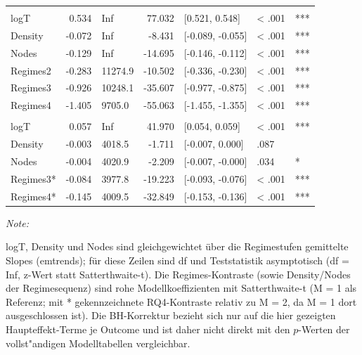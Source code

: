 \begin{table}[!h]
\begin{threeparttable}
\begin{tabular}[t]{lrlrlll}
\addlinespace[0.3em]
\multicolumn{7}{l}{\textbf{controllability}}\\
\hspace{1em}logT & 0.534 & Inf & 77.032 & {}[0.521, 0.548] & < .001 & ***\\
\hspace{1em}Density & -0.072 & Inf & -8.431 & {}[-0.089, -0.055] & < .001 & ***\\
\hspace{1em}Nodes & -0.129 & Inf & -14.695 & {}[-0.146, -0.112] & < .001 & ***\\
\hspace{1em}Regimes2 & -0.283 & 11274.9 & -10.502 & {}[-0.336, -0.230] & < .001 & ***\\
\hspace{1em}Regimes3 & -0.926 & 10248.1 & -35.607 & {}[-0.977, -0.875] & < .001 & ***\\
\hspace{1em}Regimes4 & -1.405 & 9705.0 & -55.063 & {}[-1.455, -1.355] & < .001 & ***\\
\addlinespace[0.3em]
\multicolumn{7}{l}{\textbf{regime sequence}}\\
\hspace{1em}logT & 0.057 & Inf & 41.970 & {}[0.054, 0.059] & < .001 & ***\\
\hspace{1em}Density & -0.003 & 4018.5 & -1.711 & {}[-0.007, 0.000] & .087 & \\
\hspace{1em}Nodes & -0.004 & 4020.9 & -2.209 & {}[-0.007, -0.000] & .034 & *\\
\hspace{1em}Regimes3* & -0.084 & 3977.8 & -19.223 & {}[-0.093, -0.076] & < .001 & ***\\
\hspace{1em}Regimes4* & -0.145 & 4009.5 & -32.849 & {}[-0.153, -0.136] & < .001 & ***\\
\bottomrule
\end{tabular}
\begin{tablenotes}
\item \textit{Note: } 
\item logT, Density und Nodes sind gleichgewichtet über die Regimestufen gemittelte Slopes (emtrends); für diese Zeilen sind df und Teststatistik asymptotisch (df = Inf, z-Wert statt Satterthwaite-t). Die Regimes-Kontraste (sowie Density/Nodes der Regimesequenz) sind rohe Modellkoeffizienten mit Satterthwaite-t (M = 1 als Referenz; mit * gekennzeichnete RQ4-Kontraste relativ zu M = 2, da M = 1 dort ausgeschlossen ist). Die BH-Korrektur bezieht sich nur auf die hier gezeigten Haupteffekt-Terme je Outcome und ist daher nicht direkt mit den $p$-Werten der vollst"andigen Modelltabellen vergleichbar.
\end{tablenotes}
\end{threeparttable}
\end{table}
